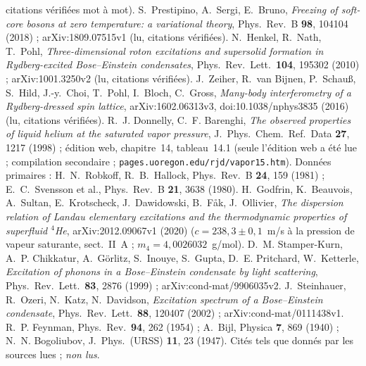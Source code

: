 citations vérifiées mot à mot).
 S.~Prestipino, A.~Sergi, E.~Bruno, \emph{Freezing of soft-core bosons at zero temperature: a
variational theory}, Phys.\ Rev.\ B \textbf{98}, 104104 (2018) ; arXiv:1809.07515v1 (lu, citations vérifiées).
 N.~Henkel, R.~Nath, T.~Pohl, \emph{Three-dimensional roton excitations and supersolid formation in
Rydberg-excited Bose--Einstein condensates}, Phys.\ Rev.\ Lett.\ \textbf{104}, 195302 (2010) ; arXiv:1001.3250v2 (lu,
citations vérifiées).
 J.~Zeiher, R.~van Bijnen, P.~Schau\ss, S.~Hild, J.-y.~Choi, T.~Pohl, I.~Bloch, C.~Gross,
\emph{Many-body interferometry of a Rydberg-dressed spin lattice}, arXiv:1602.06313v3, doi:10.1038/nphys3835 (2016)
(lu, citations vérifiées).
 R.~J. Donnelly, C.~F. Barenghi, \emph{The observed properties of liquid helium at the saturated vapor
pressure}, J.\ Phys.\ Chem.\ Ref.\ Data \textbf{27}, 1217 (1998) ; édition web, chapitre~14, tableau~14.1 (seule
l'édition web a été lue ; compilation secondaire ; \texttt{pages.uoregon.edu/rjd/vapor15.htm}). Données primaires : H.~N.~Robkoff, R.~B.~Hallock, Phys.\ Rev.\ B \textbf{24}, 159 (1981) ; E.~C.~Svensson et al., Phys.\ Rev.\ B \textbf{21}, 3638 (1980).
 H.~Godfrin, K.~Beauvois, A.~Sultan, E.~Krotscheck, J.~Dawidowski, B.~F{\aa}k, J.~Ollivier,
\emph{The dispersion relation of Landau elementary excitations and the thermodynamic properties of superfluid $^4$He},
arXiv:2012.09067v1 (2020) ($c=238{,}3\pm0{,}1$~m/s à la pression de vapeur saturante, sect.~II~A ; $m_4=4{,}0026032$~g/mol).
 D.~M. Stamper-Kurn, A.~P. Chikkatur, A.~G\"orlitz, S.~Inouye, S.~Gupta, D.~E. Pritchard, W.~Ketterle,
\emph{Excitation of phonons in a Bose--Einstein condensate by light scattering}, Phys.\ Rev.\ Lett.\ \textbf{83}, 2876
(1999) ; arXiv:cond-mat/9906035v2.
 J.~Steinhauer, R.~Ozeri, N.~Katz, N.~Davidson, \emph{Excitation spectrum of a Bose--Einstein
condensate}, Phys.\ Rev.\ Lett.\ \textbf{88}, 120407 (2002) ; arXiv:cond-mat/0111438v1.
 R.~P. Feynman, Phys.\ Rev.\ \textbf{94}, 262 (1954) ; A.~Bijl, Physica \textbf{7}, 869 (1940) ;
N.~N. Bogoliubov, J.\ Phys.\ (URSS) \textbf{11}, 23 (1947). Cités tels que donnés par les sources lues ; \emph{non lus}.
